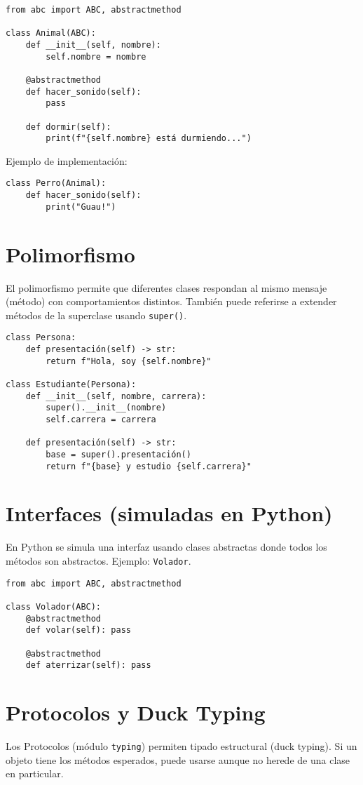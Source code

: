 \documentclass[12pt]{article}
\begin{document}
\begin{verbatim}
from abc import ABC, abstractmethod

class Animal(ABC):
    def __init__(self, nombre):
        self.nombre = nombre

    @abstractmethod
    def hacer_sonido(self):
        pass

    def dormir(self):
        print(f"{self.nombre} está durmiendo...")
\end{verbatim}

Ejemplo de implementación:
\begin{verbatim}
class Perro(Animal):
    def hacer_sonido(self):
        print("Guau!")
\end{verbatim}

\section{Polimorfismo}
El polimorfismo permite que diferentes clases respondan al mismo mensaje
(método) con comportamientos distintos. También puede referirse a extender
métodos de la superclase usando \texttt{super()}.

\begin{verbatim}
class Persona:
    def presentación(self) -> str:
        return f"Hola, soy {self.nombre}"

class Estudiante(Persona):
    def __init__(self, nombre, carrera):
        super().__init__(nombre)
        self.carrera = carrera

    def presentación(self) -> str:
        base = super().presentación()
        return f"{base} y estudio {self.carrera}"
\end{verbatim}

\section{Interfaces (simuladas en Python)}
En Python se simula una interfaz usando clases abstractas donde todos los métodos
son abstractos. Ejemplo: \texttt{Volador}.

\begin{verbatim}
from abc import ABC, abstractmethod

class Volador(ABC):
    @abstractmethod
    def volar(self): pass

    @abstractmethod
    def aterrizar(self): pass
\end{verbatim}

\section{Protocolos y Duck Typing}
Los Protocolos (módulo \texttt{typing}) permiten tipado estructural (duck typing).
Si un objeto tiene los métodos esperados, puede usarse aunque no herede de una
clase en particular.
\end{document}
